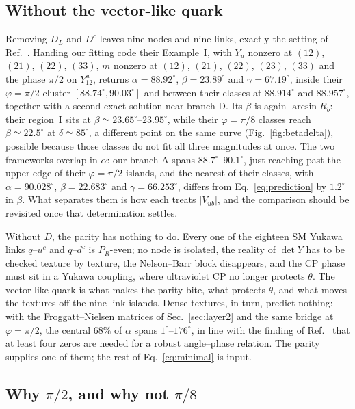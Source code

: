 \documentclass[submission, Phys]{SciPost}
\newcommand{\bt}{\bar\theta}
\newcommand{\PR}{P_R}
\begin{document}
\subsection{Without the vector-like quark}
\label{sec:noD}

Removing $D_L$ and $D^c$ leaves nine nodes and nine links, exactly the
setting of Ref.~\cite{Arkani-Hamed:2026uos}. Handing our fitting code
their Example~I, with $Y_u$ nonzero at $(12)$, $(21)$, $(22)$, $(33)$, $m$
nonzero at $(12)$, $(21)$, $(22)$, $(23)$, $(33)$ and the phase $\pi/2$ on
$Y^u_{12}$, returns $\alpha=88.92^\circ$, $\beta=23.89^\circ$ and
$\gamma=67.19^\circ$, inside
their $\varphi=\pi/2$ cluster $[88.74^\circ,90.03^\circ]$ and between
their classes at $88.914^\circ$ and $88.957^\circ$, together with a
second exact solution near branch D. Its $\beta$ is again
$\arcsin R_b$: their region~I sits at $\beta\simeq23.65^\circ$--$23.95^\circ$,
while their $\varphi=\pi/8$ classes reach $\beta\simeq22.5^\circ$ at
$\delta\simeq85^\circ$, a different point on the same curve
(Fig.~\ref{fig:betadelta}), possible because those classes do not fit
all three magnitudes at once. The two frameworks overlap in $\alpha$:
our branch A spans $88.7^\circ$--$90.1^\circ$, just reaching past the
upper edge of their $\varphi=\pi/2$ islands, and the nearest of their
classes, with $\alpha=90.028^\circ$, $\beta=22.683^\circ$ and
$\gamma=66.253^\circ$, differs from
Eq.~\eqref{eq:prediction} by $1.2^\circ$ in $\beta$. What separates them
is how each treats $|V_{ub}|$, and the comparison should be revisited
once that determination settles.

Without $D$, the parity has nothing to do. Every one of the eighteen
SM Yukawa links $q$--$u^c$ and $q$--$d^c$ is $\PR$-even; no node is
isolated, the reality of $\det Y$ has to be checked texture by
texture, the Nelson--Barr block disappears, and the CP phase must sit
in a Yukawa coupling, where ultraviolet CP no longer protects $\bt$.
The vector-like quark is what makes the parity bite, what protects
$\bt$, and what moves the textures off the nine-link islands. Dense
textures, in turn, predict nothing: with the Froggatt--Nielsen matrices
of Sec.~\ref{sec:layer2} and the same bridge at $\varphi=\pi/2$, the
central $68\%$ of $\alpha$ spans $1^\circ$--$176^\circ$, in line with the
finding of Ref.~\cite{Arkani-Hamed:2026uos} that at least four zeros
are needed for a robust angle--phase relation. The parity supplies one
of them; the rest of Eq.~\eqref{eq:minimal} is input.

\subsection{Why $\pi/2$, and why not $\pi/8$}
\label{sec:quantization}
\end{document}
